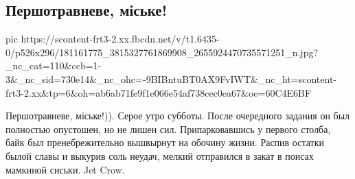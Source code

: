  
 
 
 
 
\subsection{Першотравневе, міське!}
\label{sec:01_05_2021.fb.shumaher_zhenja.1.pervomaj_musor}

\ifcmt
  pic https://scontent-frt3-2.xx.fbcdn.net/v/t1.6435-0/p526x296/181161775_3815327761869908_2655924470735571251_n.jpg?_nc_cat=110&ccb=1-3&_nc_sid=730e14&_nc_ohc=-9BIBntuBT0AX9FvIWT&_nc_ht=scontent-frt3-2.xx&tp=6&oh=ab6ab71fe9f1e066e54af738cec0ea67&oe=60C4E6BF
\fi

Першотравневе, міське!)). Серое утро субботы. После очередного задания он был
полностью опустошен, но не лишен сил. Припарковавшись у первого столба, байк
был пренебрежительно вышвырнут на обочину жизни. Распив остатки былой славы и
выкурив соль неудач, мелкий отправился в закат в поисах мамкиной сиськи. Jet
Crow.

